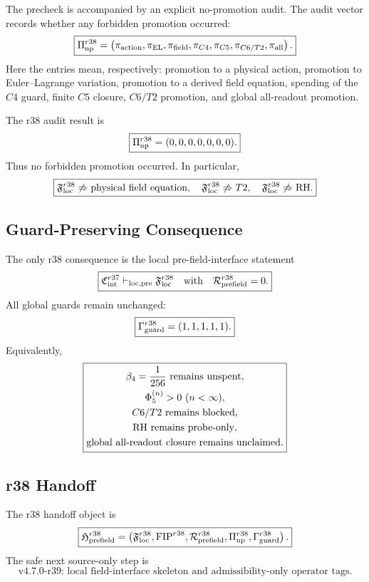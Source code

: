 The precheck is accompanied by an explicit no-promotion audit.  The audit vector
records whether any forbidden promotion occurred:
\[
\boxed{
\Pi_{\rm np}^{r38}
=
\left(
\pi_{\rm action},
\pi_{\rm EL},
\pi_{\rm field},
\pi_{C4},
\pi_{C5},
\pi_{C6/T2},
\pi_{\rm all}
\right).
}
\]
Here the entries mean, respectively: promotion to a physical action, promotion
to Euler--Lagrange variation, promotion to a derived field equation, spending of
the \(C4\) guard, finite \(C5\) closure, \(C6/T2\) promotion, and global
all-readout promotion.

The r38 audit result is
\[
\boxed{
\Pi_{\rm np}^{r38}=(0,0,0,0,0,0,0).
}
\]
Thus no forbidden promotion occurred.  In particular,
\[
\boxed{
\mathfrak F_{\rm loc}^{r38}
\not\Rightarrow
\hbox{physical field equation},
\quad
\mathfrak F_{\rm loc}^{r38}
\not\Rightarrow
T2,
\quad
\mathfrak F_{\rm loc}^{r38}
\not\Rightarrow
\mathrm{RH}.
}
\]

\subsection{Guard-Preserving Consequence}
\label{subsec:r38-guard-preserving-consequence}

The only r38 consequence is the local pre-field-interface statement
\[
\boxed{
\mathfrak C_{\rm int}^{r37}
\vdash_{\rm loc,pre}
\mathfrak F_{\rm loc}^{r38}
\quad\hbox{with}\quad
\mathcal R_{\rm prefield}^{r38}=0.
}
\]
All global guards remain unchanged:
\[
\boxed{
\Gamma_{\rm guard}^{r38}=(1,1,1,1,1).
}
\]
Equivalently,
\[
\boxed{
\begin{gathered}
\beta_4={1\over256}\hbox{ remains unspent},\\
\Phi_5^{(n)}>0\ (n<\infty),\\
C6/T2\hbox{ remains blocked},\\
\mathrm{RH}\hbox{ remains probe-only},\\
\hbox{global all-readout closure remains unclaimed}.
\end{gathered}
}
\]

\subsection{r38 Handoff}
\label{subsec:r38-handoff}

The r38 handoff object is
\[
\boxed{
\mathfrak H_{\rm prefield}^{r38}
=
\left(
\mathfrak F_{\rm loc}^{r38},
\mathrm{FIP}^{r38},
\mathcal R_{\rm prefield}^{r38},
\Pi_{\rm np}^{r38},
\Gamma_{\rm guard}^{r38}
\right).
}
\]
The safe next source-only step is
\[
\boxed{
\text{v4.7.0-r39: local field-interface skeleton and admissibility-only operator tags.}
}
\]



